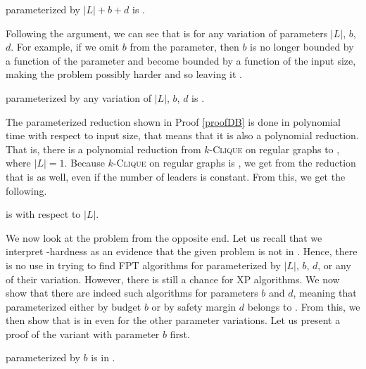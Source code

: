 \begin{remark}\label{remark:LnBD:Wh}
    \HL parameterized by $|L|+b+d$ is \Wh.
\end{remark}

Following the argument, we can see that \HL is \Wh for any variation of parameters $|L|$, $b$, $d$.
For example, if we omit $b$ from the parameter, then $b$ is no longer bounded by a function of the parameter and
become bounded by a function of the input size, making the problem possibly harder and so leaving it \Wh.

\begin{corollary}\label{cor:LnBD:variation:Wh}
    \HL parameterized by any variation of $|L|$, $b$, $d$ is \Wh.
\end{corollary}

The parameterized reduction shown in Proof \ref{proofDB} is done in polynomial time with respect to input size,
that means that it is also a polynomial reduction.
That is, there is a polynomial reduction from $k$-\textsc{Clique} on regular graphs to \HL, where $|L| = 1$.
Because $k$-\textsc{Clique} on regular graphs is \NPh, we get from the reduction that \HL is \NPh as well,
even if the number of leaders is constant.
From this, we get the following.

\begin{corollary}\label{cor:Ln:pNPh}
    \HL is \pNPh with respect to $|L|$.
\end{corollary}


We now look at the problem from the opposite end.
Let us recall that we interpret \W-hardness as an evidence that the given problem is not in \FPT.
Hence, there is no use in trying to find FPT algorithms for \HL parameterized by $|L|$, $b$, $d$, or any of their variation.
However, there is still a chance for XP algorithms.
We now show that there are indeed such algorithms for parameters $b$ and $d$, meaning that
\HL parameterized either by budget $b$ or by safety margin $d$ belongs to \XP.
From this, we then show that \HLshort is in \XP even for the other parameter variations.
Let us present a proof of the variant with parameter $b$ first.

\begin{theorem}\label{theorem:B:XP}
    \HL parameterized by $b$ is in \XP.
\end{theorem}

